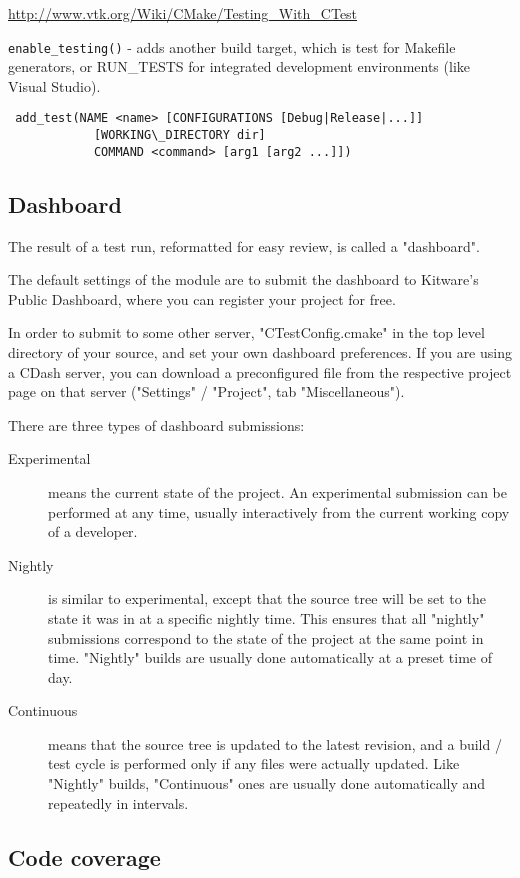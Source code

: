 \documentclass[a4paper,10pt]{article}
\begin{document}
\url{http://www.vtk.org/Wiki/CMake/Testing_With_CTest}


\texttt{enable\_testing()} -  adds another build target, which is test for Makefile generators, or RUN\_TESTS for integrated development environments (like Visual Studio).


\begin{verbatim}
 add_test(NAME <name> [CONFIGURATIONS [Debug|Release|...]]
            [WORKING\_DIRECTORY dir]
            COMMAND <command> [arg1 [arg2 ...]])
\end{verbatim}

\subsection{Dashboard}

The result of a test run, reformatted for easy review, is called a "dashboard".
            
The default settings of the module are to submit the dashboard to Kitware's Public Dashboard, where you can register your project for free.

In order to submit to some other server, "CTestConfig.cmake" in the top level directory of your source, and set your own dashboard preferences. If you are using a CDash server, you can download a preconfigured file from the respective project page on that server ("Settings" / "Project", tab "Miscellaneous").


There are three types of dashboard submissions:
\begin{description}
 \item[Experimental] means the current state of the project. An experimental submission can be performed at any time, usually interactively from the current working copy of a developer.
  \item[Nightly] is similar to experimental, except that the source tree will be set to the state it was in at a specific nightly time. This ensures that all "nightly" submissions correspond to the state of the project at the same point in time. "Nightly" builds are usually done automatically at a preset time of day.
 \item[Continuous] means that the source tree is updated to the latest revision, and a build / test cycle is performed only if any files were actually updated. Like "Nightly" builds, "Continuous" ones are usually done automatically and repeatedly in intervals.
\end{description}

\subsection{Code coverage}
\end{document}
